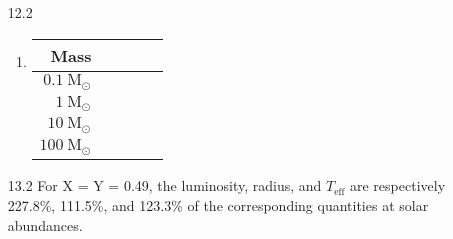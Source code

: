 \documentclass[11pt]{article}
\newcommand\msol{\mathrm{M}_\odot}
\begin{document}
\begin{enumerate}
\begin{enumerate}
    \end{enumerate}

\item [12.2] %
	\begin{enumerate}
    
    \item 
    	\begin{table}[H]
        \centering
        \begin{tabular}{ r | c | c | c | c }
          Mass  &  &  &  &  \\ \hline
          $0.1~\msol$ &  &  &  &  \\
          $1~\msol$ &  &  &  &  \\
          $10~\msol$ &  &  &  &  \\
          $100~\msol$ &  &  &  &  \\
        \end{tabular}
        \end{table}

        
    \end{enumerate}

\item [13.2]
	For X = Y = 0.49, the luminosity, radius, and $T_\mathrm{eff}$ are respectively 227.8\%, 111.5\%, and 123.3\% of the corresponding quantities at solar abundances.


\end{enumerate}
\end{document}
